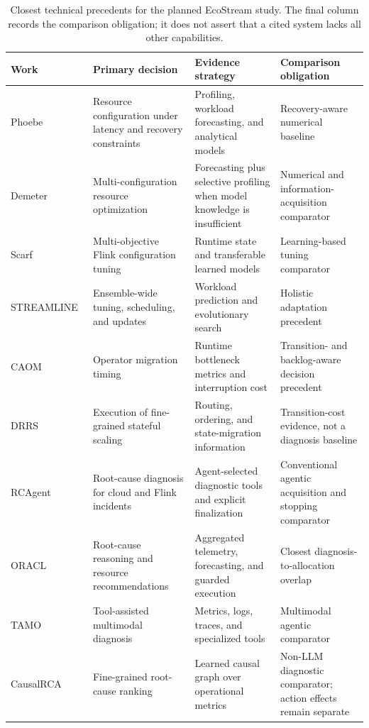 \begin{table}[t]
\caption{Closest technical precedents for the planned EcoStream study. The final column records the comparison obligation; it does not assert that a cited system lacks all other capabilities.}
\label{tab:related-work}
\centering
\footnotesize
\setlength{\tabcolsep}{4pt}
\renewcommand{\arraystretch}{1.13}
\begin{tabularx}{\textwidth}{@{}p{} p{} p{} >{\raggedright\arraybackslash}X@{}}
\toprule
\textbf{Work} & \textbf{Primary decision} & \textbf{Evidence strategy} & \textbf{Comparison obligation} \\
\midrule
Phoebe~\cite{geldenhuys2022phoebe} & Resource configuration under latency and recovery constraints & Profiling, workload forecasting, and analytical models & Recovery-aware numerical baseline \\
Demeter~\cite{geldenhuys2024demeter} & Multi-configuration resource optimization & Forecasting plus selective profiling when model knowledge is insufficient & Numerical and information-acquisition comparator \\
Scarf~\cite{liu2026scarf} & Multi-objective Flink configuration tuning & Runtime state and transferable learned models & Learning-based tuning comparator \\
STREAMLINE~\cite{pedratscher2025streamline} & Ensemble-wide tuning, scheduling, and updates & Workload prediction and evolutionary search & Holistic adaptation precedent \\
CAOM~\cite{tan2025caom} & Operator migration timing & Runtime bottleneck metrics and interruption cost & Transition- and backlog-aware decision precedent \\
DRRS~\cite{qing2025drrs} & Execution of fine-grained stateful scaling & Routing, ordering, and state-migration information & Transition-cost evidence, not a diagnosis baseline \\
RCAgent~\cite{wang2024rcagent} & Root-cause diagnosis for cloud and Flink incidents & Agent-selected diagnostic tools and explicit finalization & Conventional agentic acquisition and stopping comparator \\
ORACL~\cite{bai2026oracl} & Root-cause reasoning and resource recommendations & Aggregated telemetry, forecasting, and guarded execution & Closest diagnosis-to-allocation overlap \\
TAMO~\cite{zhang2025tamo} & Tool-assisted multimodal diagnosis & Metrics, logs, traces, and specialized tools & Multimodal agentic comparator \\
CausalRCA~\cite{xin2023causalrca} & Fine-grained root-cause ranking & Learned causal graph over operational metrics & Non-LLM diagnostic comparator; action effects remain separate \\
\bottomrule
\end{tabularx}
\end{table}


